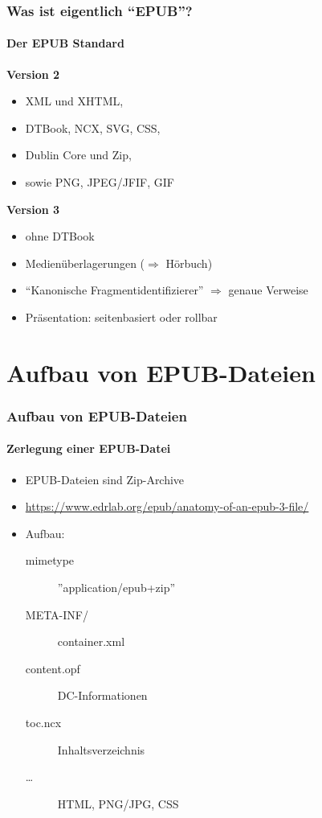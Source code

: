 \documentclass[12pt,ngerman]{beamer}
\begin{document}
\begin{frame}
\frametitle{Was ist eigentlich \enquote{EPUB}?}
\framesubtitle{Der EPUB Standard}

\textbf{Version 2}

\begin{itemize}
\item XML und XHTML,
\item DTBook, NCX, SVG, CSS,
\item Dublin Core und Zip,
\item sowie PNG, JPEG/JFIF, GIF
\end{itemize}

\textbf{Version 3}

\begin{itemize}
	\item ohne DTBook
	\item Medienüberlagerungen ($\Rightarrow$ Hörbuch)
	\item \enquote{Kanonische Fragmentidentifizierer} $\Rightarrow$ genaue Verweise
	\item Präsentation: seitenbasiert oder rollbar
\end{itemize}

\end{frame}

\section{Aufbau von EPUB-Dateien}

\begin{frame}
\frametitle{Aufbau von EPUB-Dateien}
\framesubtitle{Zerlegung einer EPUB-Datei}

\begin{itemize}
\item EPUB-Dateien sind Zip-Archive
\item \url{https://www.edrlab.org/epub/anatomy-of-an-epub-3-file/}
\item Aufbau:

\begin{description}
\item [mimetype] ''application/epub+zip''
\item [META-INF/] container.xml
\item [content.opf] DC-Informationen
\item [toc.ncx] Inhaltsverzeichnis
\item [\ldots] HTML, PNG/JPG, CSS 
\end{description}
\end{itemize}

\end{frame}
\end{document}
